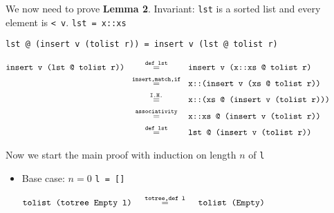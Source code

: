 \begin{itemize}
{        We now need to prove \textbf{Lemma 2}. Invariant: \texttt{lst} is a sorted list and every element is \texttt{< v}. \texttt{lst = x::xs}
        \begin{center}
            \texttt{lst @ (insert v (tolist r)) = insert v (lst @ tolist r)}
        \end{center}
        \begin{displaymath}
            \begin{aligned}
                \texttt{insert v (lst @ tolist r))}
                &\eq{def lst}{insert v (x::xs @ tolist r)} \\
                &\eq{insert,match,if}{x::(insert v (xs @ tolist r))} \\
                &\eq{I.H.}{x::(xs @ (insert v (tolist r)))} \\
                &\eq{associativity}{x::xs @ (insert v (tolist r))} \\
                &\eq{def lst}{lst @ (insert v (tolist r))} \\
            \end{aligned}
        \end{displaymath}
    }
\end{itemize}


Now we start the main proof with induction on length \(n\) of \texttt{l}

\begin{itemize}
    \item {
        Base case: \(n = 0\) \texttt{l = []}

        \begin{displaymath}
            \begin{aligned}
                \texttt{tolist (totree Empty l)}
                &\eq{totree,def l}{tolist (Empty)} \\
            \end{aligned}
        \end{displaymath}
    }
\end{itemize}